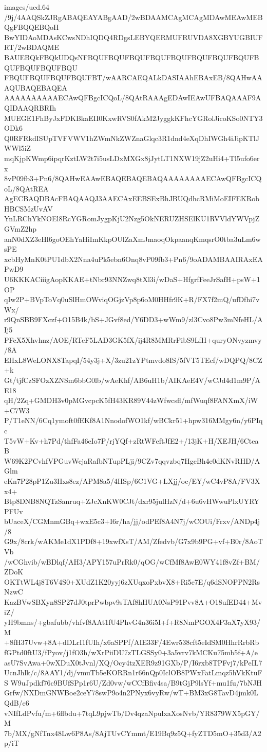 \begin{filecontents*}{images/ucd.64}
/9j/4AAQSkZJRgABAQEAYABgAAD/2wBDAAMCAgMCAgMDAwMEAwMEBQgFBQQEBQoH
BwYIDAoMDAsKCwsNDhIQDQ4RDgsLEBYQERMUFRUVDA8XGBYUGBIUFRT/2wBDAQME
BAUEBQkFBQkUDQsNFBQUFBQUFBQUFBQUFBQUFBQUFBQUFBQUFBQUFBQUFBQUFBQU
FBQUFBQUFBQUFBQUFBT/wAARCAEQALkDASIAAhEBAxEB/8QAHwAAAQUBAQEBAQEA
AAAAAAAAAAECAwQFBgcICQoL/8QAtRAAAgEDAwIEAwUFBAQAAAF9AQIDAAQRBRIh
MUEGE1FhByJxFDKBkaEII0KxwRVS0fAkM2JyggkKFhcYGRolJicoKSo0NTY3ODk6
Q0RFRkdISUpTVFVWV1hZWmNkZWZnaGlqc3R1dnd4eXqDhIWGh4iJipKTlJWWl5iZ
mqKjpKWmp6ipqrKztLW2t7i5usLDxMXGx8jJytLT1NXW19jZ2uHi4+Tl5ufo6erx
8vP09fb3+Pn6/8QAHwEAAwEBAQEBAQEBAQAAAAAAAAECAwQFBgcICQoL/8QAtREA
AgECBAQDBAcFBAQAAQJ3AAECAxEEBSExBhJBUQdhcRMiMoEIFEKRobHBCSMzUvAV
YnLRChYkNOEl8RcYGRomJygpKjU2Nzg5OkNERUZHSElKU1RVVldYWVpjZGVmZ2hp
anN0dXZ3eHl6goOEhYaHiImKkpOUlZaXmJmaoqOkpaanqKmqsrO0tba3uLm6wsPE
xcbHyMnK0tPU1dbX2Nna4uPk5ebn6Onq8vP09fb3+Pn6/9oADAMBAAIRAxEAPwD9
U6KKKACiiigAopKKAE+tNbr93NNZwq8tXl3i/wDaS+HfgrfFeeJrSafH+psW+1OP
qIw2P+BVpToVq0uSlHmOWviqOGjzVp8p6oM0HHfr9K+R/FX7f2mQ/ufDfhi7vWx/
r9QnSBB9FXczf+O15B4k/bS+JGvf8ed/Y6DD3+wWm9/zl3Cvo8Pw3mNfeHL/AIj5
PFcX5Xhvhnz/AOE/RTcF5LAD3GK5fX/ij4R8MMRrPibS9LfH+quryONvyzmvy/8A
EHxL8WeLONX8TapqI/54y3j+X/3zu21zYPtmvdo8IS/5fVT5TEcf/wDQPQ/8CZ+k
Gt/tjfCzSFOzXZNSm6bbG0lb/wAeKhf/AB6uH1b/AIKAeE4V/wCJd4d1m9P/AE18
qH/2Zq+GMDH3v0pMGvcpcK5fH43KR89V44zWfwcsfl/mfWuqf8FANXmX/iW+C7W3
P/T1eNN/6Cq1ymoft0fEKf8A1NnodofWO1kf/wBCkr51+hpw316MMgy6n/y6PIqc
T5vW+Kv+h7Pd/thfFa46eIo7P/rjYQf+zRtWFeftJfE2+/13jK+H/XEJH/6CteaB
W69K2PCvhfVPGuvWejaRafbNTupPLji/9CZv7qqvzbq7HgcBh4e0dKNvRHD/AGlm
eKn7P28pP1Zu3Hxs8ez/APM8a5/4HSp/6C1VG+LXjj/oc/EY/wC4vP8A/FV3Xx4+
Btp8DNB8NQTzSanruq+ZJcXnKW0CJt/dxr95julHzN/d+6u6vHWwuPlxUYRYPFUv
bUaceX/CGMnmGBq+wxE5c3+I6r/ha/jj/odPEf8A4N7j/wCOUi/Frxv/ANDp4j/8
G9x/8crk/wAKMe1dX1PDf8+19xwfXsT/AM/Zfedvb/G7x9b9PG+vf+B0r/8AoTVb
/wCGhvib/wBDlqf/AH3/APY157uPrRk0/qOG/wCfMf8AwE0WY41f8vZf+BM/ZDoK
OKTtWL4j8T6V4S0+XUdZ1K20yyj6zXUqxoPxbvX8+Ri5e7E/q6dSNOPPN2RsNzwC
KazBVwSBXyn8SP27dJ0tprPwbpv9sTAf8hHUA0NsP91Pvv8A+O18ufED44+MviZ/
yH9bmns/+gbafubb/vhfvf8AAt1fU4PhvG4n36i5I+f+R8NmPGOX4P3aX7yX93/M
+8fH37Uvw+8A+dDLrI1fUIh/x6aSPPf/AIE33F/4Ewr538cft5eIdSM0HhrRrbRb
fGPtd0ftU3/fPyov/j1fO3h/wXrPiiDU7zTLGSSy0+3a5vrv7kMCKu75mb5f+A/e
asU7SvAwa+0wXDuX0tJvnl/XQ/Ocy4tzXER9z91GXb/P/I6rxb8TPFvj7/kPeIL7
UcnJhlk/c/8AAY1/dj/vmuTb5eKORRn1r66nQp0IclOB8PWxFatLmqz5hVkKtuFS
W9uJpdkf76c9BUfSPp1r6U/Zd0vw/wCCfBfiv4sa/B9tGjP9lsYf+mu1fu/7bNJH
Grfw/NXDmGNWBoe2ceY78swP9o4n2PNyx6vyRw/wT+BM3xG8TavD4jmk0LQdB/e6
vNIfLdPvfu/m+6flbdu+7tqL9pjwTb/Dv4qzaNpulxaXosNvb/YR8379WX5pGY/M
7b/MX/gNfTnx48Lw6P8As/8AjTUvCYmmt/E19Bq9z5Q+fyZTD5mO+35d3/A2p/iT

\end{filecontents*}
